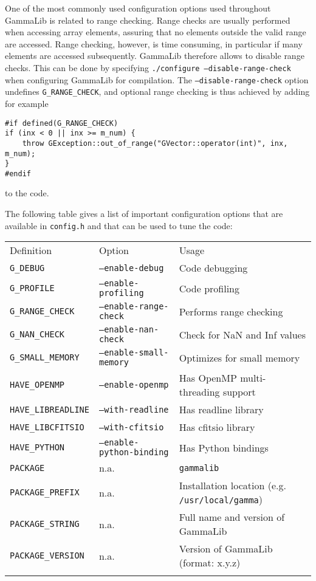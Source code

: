 \documentclass{article}[12pt,a4]
\begin{document}
One of the most commonly used configuration options used throughout GammaLib is related to
range checking.
Range checks are usually performed when accessing array elements, assuring that no
elements outside the valid range are accessed.
Range checking, however, is time consuming, in particular if many elements are
accessed subsequently.
GammaLib therefore allows to disable range checks.
This can be done by specifying {\tt ./configure --disable-range-check} when configuring 
GammaLib for compilation.
The {\tt --disable-range-check} option undefines {\tt G\_RANGE\_CHECK}, and optional
range checking is thus achieved by adding for example
\begin{verbatim}
#if defined(G_RANGE_CHECK)
if (inx < 0 || inx >= m_num) {
    throw GException::out_of_range("GVector::operator(int)", inx, m_num);
}
#endif
\end{verbatim}
to the code.

The following table gives a list of important configuration options that are available in 
{\tt config.h} and that can be used to tune the code:

\begin{center}
\begin{tabular}{lll}
\hline
\hline
\noalign{\smallskip}
Definition & Option & Usage \\
\noalign{\smallskip}
\hline
\noalign{\smallskip}
{\tt G\_DEBUG} & {\tt --enable-debug} & Code debugging \\
{\tt G\_PROFILE} & {\tt --enable-profiling} & Code profiling \\
{\tt G\_RANGE\_CHECK} & {\tt --enable-range-check} & Performs range checking \\
{\tt G\_NAN\_CHECK} & {\tt --enable-nan-check} & Check for NaN and Inf values \\
{\tt G\_SMALL\_MEMORY} & {\tt --enable-small-memory} & Optimizes for small memory \\
{\tt HAVE\_OPENMP} &{\tt  --enable-openmp} & Has OpenMP multi-threading support \\
{\tt HAVE\_LIBREADLINE} & {\tt --with-readline} & Has readline library \\
{\tt HAVE\_LIBCFITSIO} & {\tt --with-cfitsio} & Has cfitsio library \\
{\tt HAVE\_PYTHON} & {\tt --enable-python-binding} & Has Python bindings \\
{\tt PACKAGE} & n.a. & {\tt gammalib} \\
{\tt PACKAGE\_PREFIX} & n.a. & Installation location (e.g. {\tt /usr/local/gamma}) \\
{\tt PACKAGE\_STRING} & n.a. & Full name and version of GammaLib \\
{\tt PACKAGE\_VERSION} & n.a. & Version of GammaLib (format: x.y.z) \\
\noalign{\smallskip}
\hline
\end{tabular}
\end{center}
\end{document}
